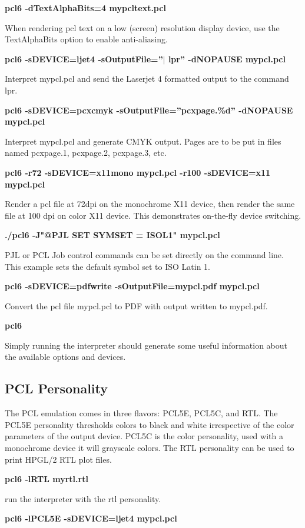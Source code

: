 \documentclass[10pt]{article}
\begin{document}
\textbf{pcl6 -dTextAlphaBits=4 mypcltext.pcl}

When rendering pcl text on a low (screen) resolution display device,
use the TextAlphaBits option to enable anti-aliasing.

\textbf{pcl6 -sDEVICE=ljet4 -sOutputFile=''$|$ lpr'' -dNOPAUSE mypcl.pcl}

Interpret mypcl.pcl and send the Laserjet 4 formatted output to the
command lpr.

\textbf{pcl6 -sDEVICE=pcxcmyk -sOutputFile=''pcxpage.\%d'' -dNOPAUSE mypcl.pcl}

Interpret mypcl.pcl and generate CMYK output. Pages are to be put in
files named pcxpage.1, pcxpage.2, pcxpage.3, etc.

\textbf{pcl6 -r72 -sDEVICE=x11mono mypcl.pcl -r100 -sDEVICE=x11 mypcl.pcl}

Render a pcl file at 72dpi on the monochrome X11 device, then render
the same file at 100 dpi on color X11 device. This demonstrates
on-the-fly device switching.

\textbf{./pcl6 -J"@PJL SET SYMSET = ISOL1" mypcl.pcl}

PJL or PCL Job control commands can be set directly on the command line.  This example sets the default symbol set to ISO Latin 1.

\textbf{pcl6 -sDEVICE=pdfwrite -sOutputFile=mypcl.pdf mypcl.pcl}

Convert the pcl file mypcl.pcl to PDF with output written to
mypcl.pdf.

\textbf{pcl6}

Simply running the interpreter should generate some useful information
about the available options and devices.  

\subsection*{PCL Personality}

The PCL emulation comes in three flavors: PCL5E, PCL5C, and RTL. The
PCL5E personality thresholds colors to black and white irrespective of
the color parameters of the output device. PCL5C is the color
personality, used with a monochrome device it will grayscale colors.
The RTL personality can be used to print HPGL/2 RTL plot files.

\textbf{pcl6 -lRTL myrtl.rtl}

run the interpreter with the rtl personality.

\textbf{pcl6 -lPCL5E -sDEVICE=ljet4 mypcl.pcl}
\end{document}
